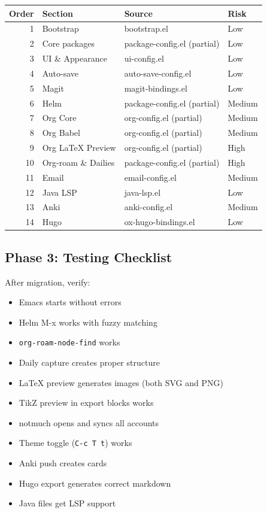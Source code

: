 \documentclass[11pt]{article}
\begin{document}
\begin{center}
\begin{tabular}{rlll}
Order & Section & Source & Risk\\
\hline
1 & Bootstrap & bootstrap.el & Low\\
2 & Core packages & package-config.el (partial) & Low\\
3 & UI \& Appearance & ui-config.el & Low\\
4 & Auto-save & auto-save-config.el & Low\\
5 & Magit & magit-bindings.el & Low\\
6 & Helm & package-config.el (partial) & Medium\\
7 & Org Core & org-config.el (partial) & Medium\\
8 & Org Babel & org-config.el (partial) & Medium\\
9 & Org \LaTeX{} Preview & org-config.el (partial) & High\\
10 & Org-roam \& Dailies & package-config.el (partial) & High\\
11 & Email & email-config.el & Medium\\
12 & Java LSP & java-lsp.el & Low\\
13 & Anki & anki-config.el & Medium\\
14 & Hugo & ox-hugo-bindings.el & Low\\
\end{tabular}
\end{center}
\subsection{Phase 3: Testing Checklist}
\label{sec:org0d6e237}

After migration, verify:

\begin{itemize}
\item[{$\square$}] Emacs starts without errors
\item[{$\square$}] Helm M-x works with fuzzy matching
\item[{$\square$}] \texttt{org-roam-node-find} works
\item[{$\square$}] Daily capture creates proper structure
\item[{$\square$}] \LaTeX{} preview generates images (both SVG and PNG)
\item[{$\square$}] TikZ preview in export blocks works
\item[{$\square$}] notmuch opens and syncs all accounts
\item[{$\square$}] Theme toggle (\texttt{C-c T t}) works
\item[{$\square$}] Anki push creates cards
\item[{$\square$}] Hugo export generates correct markdown
\item[{$\square$}] Java files get LSP support
\end{itemize}
\end{document}
